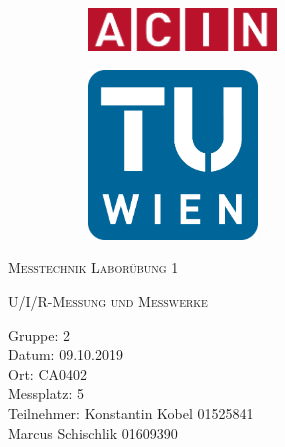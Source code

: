 \documentclass[a4paper,12pt]{article}
\begin{document}
	\begin{titlepage}
		\begin{figure}[h]
			\begin{subfigure}{1cm}
				\includegraphics[width=5cm]{img/acinlogo}
			\end{subfigure}
			\hspace{10cm}
			\begin{subfigure}{6cm}
				\includegraphics[width=4.5cm]{img/TUlogo}
			\end{subfigure}
		\end{figure}
		\centering
		\bigskip \bigskip \bigskip \bigskip \bigskip
		\scshape\Huge Messtechnik Laborübung 1\par
		\vspace{1cm}
		\scshape\Large  U/I/R-Messung und Messwerke \par
		\vspace{2cm}
		\raggedright
		\large Gruppe: 2 \\
		Datum: 09.10.2019 \\
		Ort: CA0402 \\
		Messplatz: 5 \\
		Teilnehmer: Konstantin Kobel 01525841\\
		\hspace{3.25cm}Marcus Schischlik 01609390 \\
		\vfill
		\large \par
	\end{titlepage}
\end{document}
